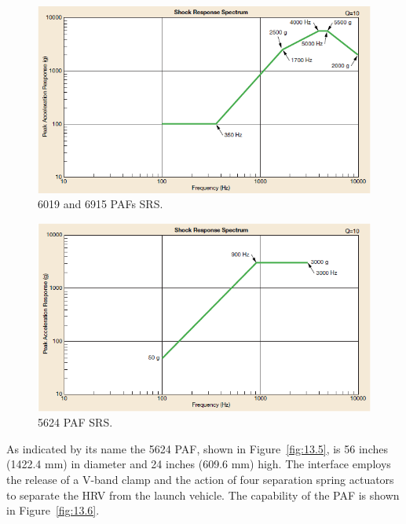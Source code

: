 \documentclass[paper=letter, fontsize=11pt]{scrartcl} %
\numberwithin{equation}{section} %
\numberwithin{figure}{section} %
\numberwithin{table}{section} %
\begin{document}
\begin{figure}[H]
    \begin{center}
        \includegraphics[width=.55\textwidth]{SS13_Shock_PAF/13-3.png}
        \caption{6019 and 6915 PAFs SRS.}
        \label{fig:13.3}
    \end{center}
\end{figure}

\begin{figure}[H]
    \begin{center}
        \includegraphics[width=.55\textwidth]{SS13_Shock_PAF/13-4.png}
        \caption{5624 PAF SRS.}
        \label{fig:13.4}
    \end{center}
\end{figure}

As indicated by its name the 5624 PAF, shown in Figure~\ref{fig:13.5}, is 56 inches (1422.4 mm) in diameter and 24 inches (609.6 mm) high. The interface employs the release of a V-band clamp and the action of four separation spring actuators to separate the HRV from the launch vehicle. The capability of the PAF is shown in Figure~\ref{fig:13.6}.
\end{document}
